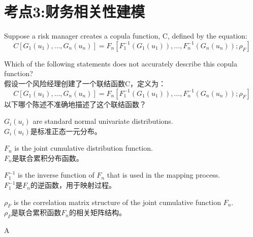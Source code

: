 \documentclass{article}
\newcounter{question} %
\begin{document}
\section{考点3:财务相关性建模}
\setcounter{question}{0}
\begin{question}
    Suppose a risk manager creates a copula function, C, defined by the equation:
    \begin{equation*}
        C\left[ G_1(u_1), \ldots, G_n(u_n) \right] = F_n \left[ F_1^{-1}(G_1(u_1)), \ldots, F_n^{-1}(G_n(u_n)); \rho_F \right]
        \end{equation*}

    Which of the following statements does not accurately describe this copula function?
    \\假设一个风险经理创建了一个联结函数C，定义为：
    \begin{equation*}
        C\left[ G_1(u_1), \ldots, G_n(u_n) \right] = F_n \left[ F_1^{-1}(G_1(u_1)), \ldots, F_n^{-1}(G_n(u_n)); \rho_F \right]
        \end{equation*}
    以下哪个陈述不准确地描述了这个联结函数？
\end{question}

\begin{choices}
    \item $G_i (u_i)$ are standard normal univariate distributions.\\
         $G_i (u_i)$是标准正态一元分布。
    \item $F_n$ is the joint cumulative distribution function.\\
         $F_n$是联合累积分布函数。
    \item $F_1^{-1}$ is the inverse function of $F_n$ that is used in the mapping process.\\
         $F_1^{-1}$是$F_n$的逆函数，用于映射过程。
    \item $\rho_F$ is the correlation matrix structure of the joint cumulative function $F_n$.\\
         $\rho_F$是联合累积函数$F_n$的相关矩阵结构。
\end{choices}

\begin{correctanswer}
    A
\end{correctanswer}
\end{document}
